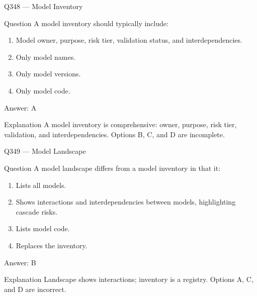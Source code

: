 \documentclass[aspectratio=169,8pt]{beamer}
\begin{document}
\begin{frame}{Q348 --- Model Inventory}
	\begin{block}{Question}
		A model inventory should typically include:
		\begin{enumerate}
			\item Model owner, purpose, risk tier, validation status, and interdependencies.
			\item Only model names.
			\item Only model versions.
			\item Only model code.
	\end{enumerate}  \end{block}
	\begin{exampleblock}{Answer: A}\end{exampleblock}
	\begin{block}{Explanation}
		A model inventory is comprehensive: owner, purpose, risk tier, validation, and interdependencies. Options B, C, and D are incomplete.
	\end{block}
\end{frame}

\begin{frame}{Q349 --- Model Landscape}
	\begin{block}{Question}
		A model landscape differs from a model inventory in that it:
		\begin{enumerate}
			\item Lists all models.
			\item Shows interactions and interdependencies between models, highlighting cascade risks.
			\item Lists model code.
			\item Replaces the inventory.
	\end{enumerate}  \end{block}
	\begin{exampleblock}{Answer: B}\end{exampleblock}
	\begin{block}{Explanation}
		Landscape shows interactions; inventory is a registry. Options A, C, and D are incorrect.
	\end{block}
\end{frame}
\end{document}
